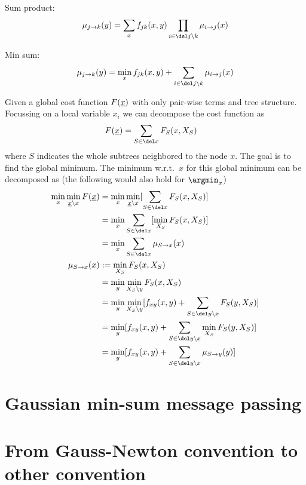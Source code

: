 Sum product:
\begin{align}
\mu_{j\to k}(y)
 = \sum_x f_{jk}(x,y) \prod_{i \in \del j \setminus k} \mu_{i\to j}(x)
\end{align}

Min sum:
\begin{align}
\mu_{j\to k}(y)
 = \min_x f_{jk}(x,y) + \sum_{i \in \del j \setminus k} \mu_{i\to j}(x)
\end{align}

Given a global cost function $F(\underline{x})$ with only pair-wise terms and
 tree structure. Focussing on a local variable $x_i$ we can
decompose the cost function as
\begin{align}
F(\xT)
 &= \sum_{S\in\del x} F_S(x,X_S)
\end{align}
where $S$ indicates the whole subtrees neighbored to the node $x$. The
goal is to find the global minimum. The minimum w.r.t.\ $x$ for this global
minimum can be decomposed as (the following would also hold for $\argmin_x$)
\begin{align}
\min_x \min_{\xT\setminus x} F(\xT)
 &= \min_x \min_{\xT\setminus x} [\sum_{S\in\del x} F_S(x,X_S)] \\
 &= \min_x \sum_{S\in\del x} [\min_{X_S} F_S(x,X_S)] \\
 &= \min_x \sum_{S\in\del x} \mu_{S\to x}(x) \\
\mu_{S\to x}(x)
 &:= \min_{X_S} F_S(x,X_S) \\
 &= \min_y \min_{X_S\setminus y} F_S(x,X_S) \\
 &= \min_y \min_{X_S\setminus y} [f_{xy}(x,y) + \sum_{S\in\del y\setminus x} F_S(y,X_S)] \\
 &= \min_y [f_{xy}(x,y) + \sum_{S\in\del y\setminus x} \min_{X_S} F_S(y,X_S)] \\
 &= \min_y [f_{xy}(x,y) + \sum_{S\in\del y\setminus x} \mu_{S\to y}(y)]
\end{align}


\section{Gaussian min-sum message passing}




\section{From Gauss-Newton convention to other convention}


